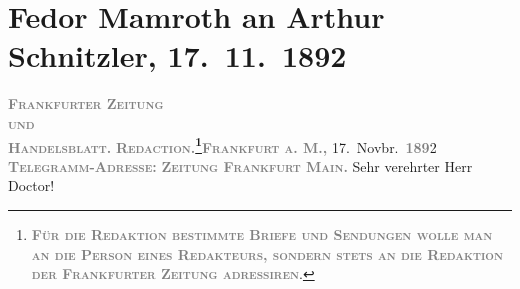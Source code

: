 

         
         \renewcommand{\erwaehntePersonen}{Personen: Rudolf Lothar, Fedor Mamroth, Eduard Sack}
         \renewcommand{\erwaehnteInstitutionen}{Institutionen: Frankfurter Städtisches Schauspielhaus, Frankfurter Zeitung}
         \renewcommand{\erwaehnteOrte}{Orte: Berlin, Frankfurt am Main, Wien}
         \renewcommand{\erwaehnteWerke}{Werke: Anatol, Cäsar Borgia’s Ende, Das Märchen. Schauspiel in drei Aufzügen, Sterben. Novelle}
               \section[Fedor Mamroth an Arthur Schnitzler, 17. 11. 1892]{ Fedor Mamroth an Arthur Schnitzler, 17. 11. 1892}\nopagebreak{}\rehead{ }\begin{ledgroupsized}[t]{13cm}\normalsize\beginnumbering{} \toendnotes[C]{\smallbreak\pagebreak[2]} 
\toendnotes[C]{\smallbreak}\pstart
           \noindent{}{\pb}\textcolor{gray}{\textbf{\textsc{Frankfurter Zeitung}}}{\\}\textsc{\textcolor{gray}{\textbf{und}}}{\\}\textcolor{gray}{\textbf{\textsc{Handelsblatt.}}}\pend
           \pstart
           \textcolor{gray}{\textbf{\textsc{Redaction.\footnote{\noindent{}\textcolor{gray}{\textbf{\textsc{Für die Redaktion bestimmte Briefe und
                                       Sendungen wolle man  an die
                                       Person eines Redakteurs, sondern stets \textbf{an die
                                          Redaktion der Frankfurter Zeitung} adressiren}}}.}}}}\hfill \textcolor{gray}{\textbf{\textsc{Frankfurt a. M.,}}}{ }17. Novbr. \textsc{\textcolor{gray}{\textbf{189}}}2\pend
           \pstart
           \textcolor{gray}{\textbf{\textsc{Telegramm-Adresse:}}}\pend
           \pstart
           \textcolor{gray}{\textbf{\textsc{Zeitung Frankfurt Main.}}}\pend
           \pstart{}Sehr verehrter Herr Doctor!\pend\pstart

\end{ledgroupsized}
